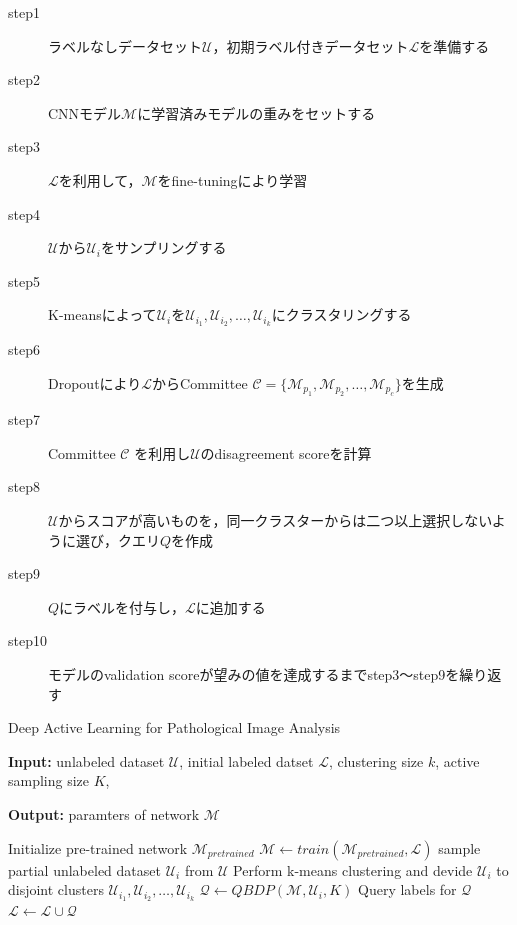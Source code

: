 \begin{description}
    \item[step1] ラベルなしデータセット$\mathcal{U}$，初期ラベル付きデータセット$\mathcal{L}$を準備する
    \item[step2] CNNモデル$\mathcal{M}$に学習済みモデルの重みをセットする
    \item[step3] $\mathcal{L}$を利用して，$\mathcal{M}$をfine-tuningにより学習
    \item[step4] $\mathcal{U}$から$\mathcal{U}_i$をサンプリングする
    \item[step5] K-meansによって$\mathcal{U}_i$を$\mathcal{U}_{i_1}, \mathcal{U}_{i_2}, \dots, \mathcal{U}_{i_k}$にクラスタリングする
    \item[step6] Dropoutにより$\mathcal{L}$からCommittee $\mathcal{C} = \{\mathcal{M}_{p_1}, \mathcal{M}_{p_2}, \dots, \mathcal{M}_{p_c} \}$を生成
    \item[step7] Committee $\mathcal{C}$ を利用し$\mathcal{U}$のdisagreement scoreを計算
    \item[step8] $\mathcal{U}$からスコアが高いものを，同一クラスターからは二つ以上選択しないように選び，クエリ$Q$を作成
    \item[step9] $Q$にラベルを付与し，$\mathcal{L}$に追加する
    \item[step10] モデルのvalidation scoreが望みの値を達成するまでstep3〜step9を繰り返す
\end{description}


\begin{algorithm}[h]
    \caption{Deep Active Learning for Pathological Image Analysis}
    \label{algo:dal}
    \begin{algorithmic}
        \STATE \textbf{Input: } 
        unlabeled dataset $\mathcal{U}$,
        initial labeled datset $\mathcal{L}$,
        clustering size $k$, 
        active sampling size $K$,
    \end{algorithmic}

    \begin{algorithmic}
        \STATE \textbf{Output: } paramters of network $\mathcal{M}$
    \end{algorithmic}

    \begin{algorithmic}[1]
        \STATE Initialize pre-trained network $\mathcal{M}_{pretrained}$
        \REPEAT
            \STATE $\mathcal{M} \leftarrow train (\mathcal{M}_{pretrained}, \mathcal{L})$
            \STATE sample partial unlabeled dataset $\mathcal{U}_i$ from $\mathcal{U}$
            \STATE Perform k-means clustering and devide $\mathcal{U}_i$ to disjoint clusters $\mathcal{U}_{i_1}, \mathcal{U}_{i_2}, \dots, \mathcal{U}_{i_k}$
            \STATE $\mathcal{Q} \leftarrow QBDP(\mathcal{M}, \mathcal{U}_i, K)$
            \STATE Query labels for $\mathcal{Q}$
            \STATE $\mathcal{L} \leftarrow \mathcal{L} \cup \mathcal{Q}$

    \end{algorithmic}
  \end{algorithm}
  
